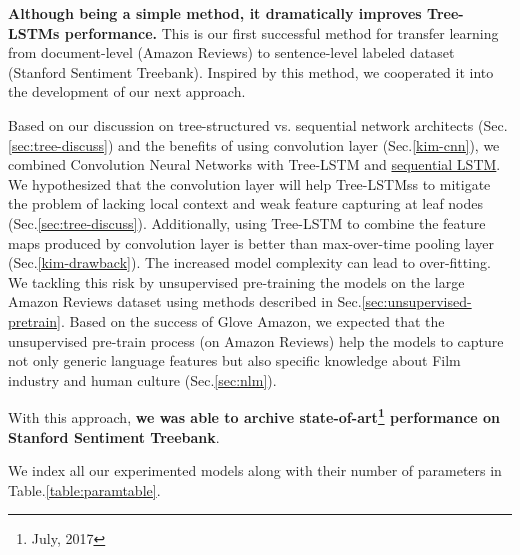 \begin{description}
\textbf{Although being a simple method, it dramatically improves Tree-LSTMs performance.}
This is our first successful method for transfer learning from document-level (Amazon Reviews) to sentence-level labeled dataset (Stanford Sentiment Treebank).
Inspired by this method, we cooperated it into the development of our next approach.

\item[\deschyperlink{sec:CNNtree}{Combining Recusive Neural Networks with Convolution Neural Networks}] Based on our discussion on tree-structured vs. sequential network architects (Sec.\ref{sec:tree-discuss}) and the benefits of using convolution layer (Sec.\ref{kim-cnn}), we combined Convolution Neural Networks with Tree-LSTM and \hyperref[sec:lstm]{sequential LSTM}.
We hypothesized that the convolution layer will help Tree-LSTMss to mitigate the problem of lacking local context and weak feature capturing at leaf nodes (Sec.\ref{sec:tree-discuss}).
Additionally, using Tree-LSTM to combine the feature maps produced by convolution layer is better than max-over-time pooling layer (Sec.\ref{kim-drawback}).
The increased model complexity can lead to over-fitting.
We tackling this risk by unsupervised pre-training the models on the large Amazon Reviews dataset using methods described in Sec.\ref{sec:unsupervised-pretrain}.
Based on the success of Glove Amazon, we expected that the unsupervised pre-train process (on Amazon Reviews) help the models to capture not only generic language features but also specific knowledge about Film industry and human culture (Sec.\ref{sec:nlm}).

With this approach, \textbf{we was able to archive state-of-art\footnote{July, 2017} performance on Stanford Sentiment Treebank}.
\end{description}

We index all our experimented models along with their number of parameters in Table.\ref{table:paramtable}.

